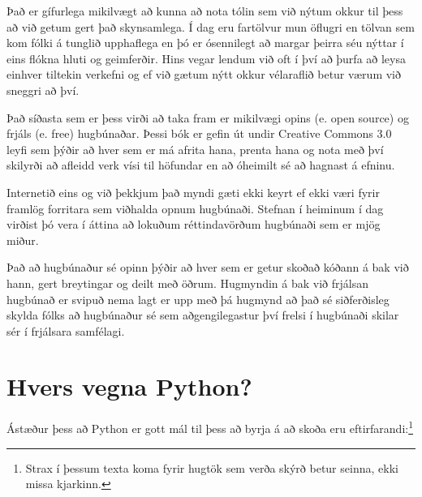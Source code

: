 Það er gífurlega mikilvægt að kunna að nota tólin sem við nýtum okkur til þess að við getum gert það skynsamlega.
Í dag eru fartölvur mun öflugri en tölvan sem kom fólki á tunglið upphaflega en þó er ósennilegt að margar þeirra séu nýttar í eins flókna hluti og geimferðir.
Hins vegar lendum við oft í því að þurfa að leysa einhver tiltekin verkefni og ef við gætum nýtt okkur vélaraflið betur værum við sneggri að því.

Það síðasta sem er þess virði að taka fram er mikilvægi opins (e. open source) og frjáls (e. free) hugbúnaðar.
Þessi bók er gefin út undir Creative Commons 3.0 leyfi sem þýðir að hver sem er má afrita hana, prenta hana og nota með því skilyrði að afleidd verk vísi til höfundar en að óheimilt sé að hagnast á efninu.

Internetið eins og við þekkjum það myndi gæti ekki keyrt ef ekki væri fyrir framlög forritara sem viðhalda opnum hugbúnaði.
Stefnan í heiminum í dag virðist þó vera í áttina að lokuðum réttindavörðum hugbúnaði sem er mjög miður. 

Það að hugbúnaður sé opinn þýðir að hver sem er getur skoðað kóðann á bak við hann, gert breytingar og deilt með öðrum.
Hugmyndin á bak við frjálsan hugbúnað er svipuð nema lagt er upp með þá hugmynd að það sé siðferðisleg skylda fólks að hugbúnaður sé sem aðgengilegastur því frelsi í hugbúnaði skilar sér í frjálsara samfélagi.

\section{Hvers vegna Python?}

Ástæður þess að Python er gott mál til þess að byrja á að skoða eru eftirfarandi:\footnote{Strax í þessum texta koma fyrir hugtök sem verða skýrð betur seinna, ekki missa kjarkinn.}

